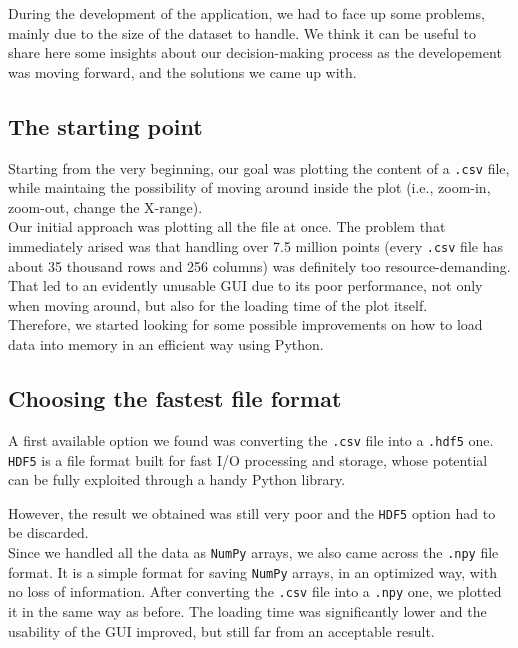 \documentclass[11pt,a4paper]{article}
\begin{document}
During the development of the application, we had to face up some problems, mainly due to the size of the dataset to handle.
We think it can be useful to share here some insights about our decision-making process as the developement was moving forward, and the solutions we came up with.

\subsection{The starting point}

Starting from the very beginning, our goal was plotting the content of a \texttt{.csv} file, while maintaing the possibility of moving around inside the plot (i.e., zoom-in, zoom-out, change the X-range).\\

Our initial approach was plotting all the file at once.
The problem that immediately arised was that handling over 7.5 million points (every \texttt{.csv} file has about 35 thousand rows and 256 columns) was definitely too resource-demanding.
That led to an evidently unusable GUI due to its poor performance, not only when moving around, but also for the loading time of the plot itself.\\

Therefore, we started looking for some possible improvements on how to load data into memory in an efficient way using Python.\\

\subsection{Choosing the fastest file format}

A first available option we found was converting the \texttt{.csv} file into a \texttt{.hdf5} one.
\texttt{HDF5} is a file format built for fast I/O processing and storage, whose potential can be fully exploited through a handy Python library.

However, the result we obtained was still very poor and the \texttt{HDF5} option had to be discarded.\\

Since we handled all the data as \texttt{NumPy} arrays, we also came across the \texttt{.npy} file format.
It is a simple format for saving \texttt{NumPy} arrays, in an optimized way, with no loss of information.
After converting the \texttt{.csv} file into a \texttt{.npy} one, we plotted it in the same way as before.
The loading time was significantly lower and the usability of the GUI improved, but still far from an acceptable result.\\
\end{document}
